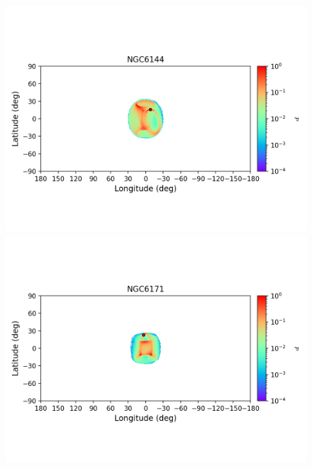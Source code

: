         \begin{figure}
            \begin{center}
                \includegraphics[clip=true, trim = 0mm 20mm 0mm 10mm, width=1\columnwidth]{images/error_plots_NGC6144.png}
                \includegraphics[clip=true, trim = 0mm 20mm 0mm 10mm, width=1\columnwidth]{images/error_plots_NGC6171.png}
                

\end{center}
\end{figure}
